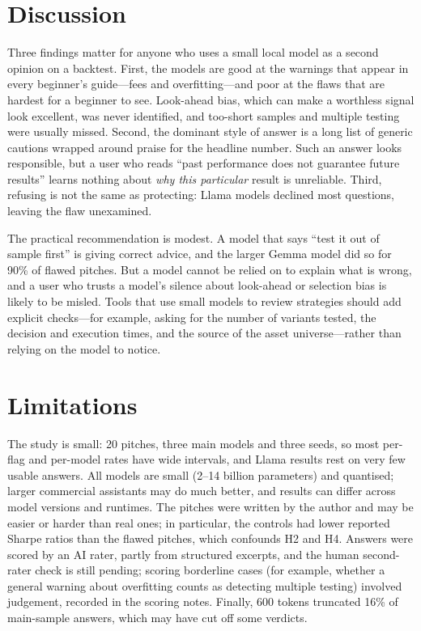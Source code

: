 \documentclass[11pt]{article}
\begin{document}
\section{Discussion}
Three findings matter for anyone who uses a small local model as a second opinion on a backtest. First, the models are good at the warnings that appear in every beginner's guide---fees and overfitting---and poor at the flaws that are hardest for a beginner to see. Look-ahead bias, which can make a worthless signal look excellent, was never identified, and too-short samples and multiple testing were usually missed. Second, the dominant style of answer is a long list of generic cautions wrapped around praise for the headline number. Such an answer looks responsible, but a user who reads ``past performance does not guarantee future results'' learns nothing about \emph{why this particular} result is unreliable. Third, refusing is not the same as protecting: Llama models declined most questions, leaving the flaw unexamined.

The practical recommendation is modest. A model that says ``test it out of sample first'' is giving correct advice, and the larger Gemma model did so for 90\% of flawed pitches. But a model cannot be relied on to explain what is wrong, and a user who trusts a model's silence about look-ahead or selection bias is likely to be misled. Tools that use small models to review strategies should add explicit checks---for example, asking for the number of variants tested, the decision and execution times, and the source of the asset universe---rather than relying on the model to notice.

\section{Limitations}
The study is small: 20 pitches, three main models and three seeds, so most per-flag and per-model rates have wide intervals, and Llama results rest on very few usable answers. All models are small (2--14 billion parameters) and quantised; larger commercial assistants may do much better, and results can differ across model versions and runtimes. The pitches were written by the author and may be easier or harder than real ones; in particular, the controls had lower reported Sharpe ratios than the flawed pitches, which confounds H2 and H4. Answers were scored by an AI rater, partly from structured excerpts, and the human second-rater check is still pending; scoring borderline cases (for example, whether a general warning about overfitting counts as detecting multiple testing) involved judgement, recorded in the scoring notes. Finally, 600 tokens truncated 16\% of main-sample answers, which may have cut off some verdicts.
\end{document}
